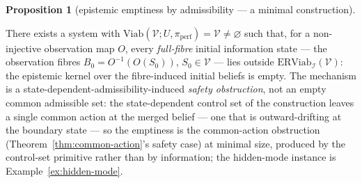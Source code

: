 \documentclass[11pt]{article}
\theoremstyle{definition}
\newtheorem{proposition}{Proposition}
\begin{document}
\begin{proposition}[epistemic emptiness by admissibility --- a minimal construction]\label{prop:emptiness}

There exists a system with
\(\mathrm{Viab}(\mathcal{V}; U, \pi_{\mathrm{perf}}) = \mathcal{V} \neq \varnothing\)
such that, for a non-injective observation map \(O\), every \emph{full-fibre} initial information state --- the observation fibres
\(B_0 = O^{-1}(O(S_0))\), \(S_0 \in \mathcal{V}\) --- lies outside
\(\mathrm{ERViab}_{\mathcal{I}}(\mathcal{V})\): the epistemic kernel
over the fibre-induced initial beliefs is empty. The mechanism is a state-dependent-admissibility-induced \emph{safety obstruction}, not an empty common admissible set: the
state-dependent control set of the construction leaves a single common
action at the merged belief --- one that is outward-drifting at the
boundary state --- so the emptiness is the common-action obstruction
(Theorem~\ref{thm:common-action}'s safety case) at minimal size, produced by the control-set primitive rather than by information; the
hidden-mode instance is Example~\ref{ex:hidden-mode}.

\end{proposition}
\end{document}
